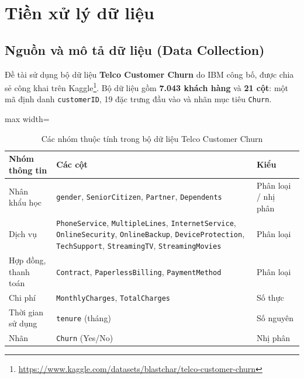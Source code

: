 \section{Tiền xử lý dữ liệu}\label{sec:data}

\subsection{Nguồn và mô tả dữ liệu (Data Collection)}
Đề tài sử dụng bộ dữ liệu \textbf{Telco Customer Churn} do IBM công bố, được chia sẻ công khai trên Kaggle\footnote{\url{https://www.kaggle.com/datasets/blastchar/telco-customer-churn}}. Bộ dữ liệu gồm \textbf{7.043 khách hàng} và \textbf{21 cột}: một mã định danh \texttt{customerID}, 19 đặc trưng đầu vào và nhãn mục tiêu \texttt{Churn}.

\begin{table}[H]
\centering
\begin{adjustbox}{max width=\textwidth}
\begin{tabular}{|p{4cm}|p{8.5cm}|l|}
\hline
\textbf{Nhóm thông tin} & \textbf{Các cột} & \textbf{Kiểu} \\
\hline
Nhân khẩu học & \texttt{gender}, \texttt{SeniorCitizen}, \texttt{Partner}, \texttt{Dependents} & Phân loại / nhị phân \\
\hline
Dịch vụ & \texttt{PhoneService}, \texttt{MultipleLines}, \texttt{InternetService}, \texttt{OnlineSecurity}, \texttt{OnlineBackup}, \texttt{DeviceProtection}, \texttt{TechSupport}, \texttt{StreamingTV}, \texttt{StreamingMovies} & Phân loại \\
\hline
Hợp đồng, thanh toán & \texttt{Contract}, \texttt{PaperlessBilling}, \texttt{PaymentMethod} & Phân loại \\
\hline
Chi phí & \texttt{MonthlyCharges}, \texttt{TotalCharges} & Số thực \\
\hline
Thời gian sử dụng & \texttt{tenure} (tháng) & Số nguyên \\
\hline
Nhãn & \texttt{Churn} (Yes/No) & Nhị phân \\
\hline
\end{tabular}
\end{adjustbox}
\caption{Các nhóm thuộc tính trong bộ dữ liệu Telco Customer Churn}
\end{table}

